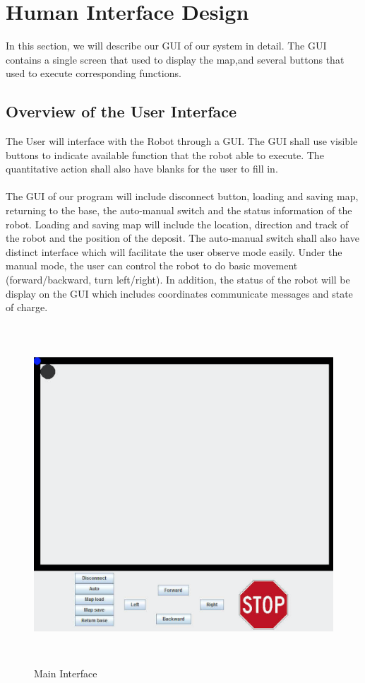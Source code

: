\documentclass[11pt, a4paper]{article}
\begin{document}
\section{Human Interface Design}
In this section, we will describe our GUI of our system in detail. The GUI contains a single screen that used to display the map,and several buttons that used to execute corresponding functions.

\subsection{Overview of the User Interface}
The User will interface with the Robot through a GUI. The GUI shall use visible buttons to indicate available function that the robot able to execute. The quantitative action shall also have blanks for the user to fill in. \\
\\
The GUI of our program will include disconnect button, loading and saving map, returning to the base, the auto-manual switch and the status information of the robot. Loading and saving map will include the location, direction and track of the robot and the position of the deposit. The auto-manual switch shall also have distinct interface which will facilitate the user observe mode easily. Under the manual mode, the user can control the robot to do basic movement (forward/backward, turn left/right). In addition, the status of the robot will be display on the GUI which includes coordinates communicate messages and state of charge.

\begin{figure}[H]
\centering
\includegraphics[height=5in]{main}
\caption[Main Interface]{Main Interface}
\end{figure}
\end{document}

